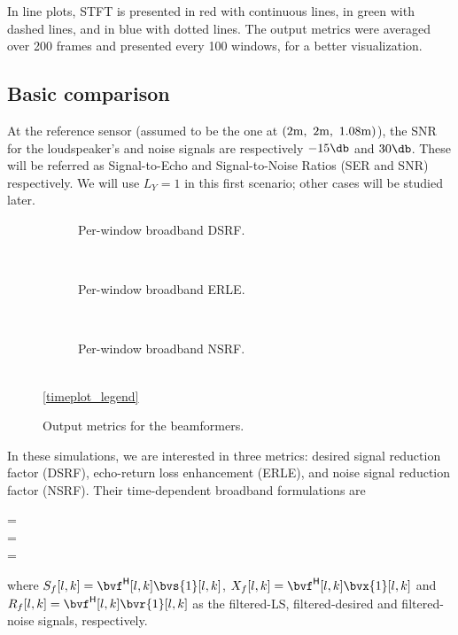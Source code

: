 In line plots, STFT is presented in red with continuous lines, \nssbt{} in green with dashed lines, and \tssbt{} in blue with dotted lines. The output metrics were averaged over 200 frames and presented every 100 windows, for a better visualization.
%

\subsection{Basic comparison}
At the reference sensor (assumed to be the one at $(2\si{\meter},~2\si{\meter},~1.08\si{\meter})$), the SNR for the loudspeaker's and noise signals are respectively $-15\dB$ and $30\dB$. These will be referred as Signal-to-Echo and Signal-to-Noise Ratios (SER and SNR) respectively. We will use $L_Y = 1$ in this first scenario; other cases will be studied later.%


\begin{figure}[!t]
	\centering
	\begin{subfigure}{\textwidth}
		\centering
		
		\caption{Per-window broadband DSRF.}
		\label{subfig:lineplot__v7__DSRF_l__iSER_n15__Ly_1__err_0}
	\end{subfigure}\\[1em]
	\begin{subfigure}{\textwidth}
		\centering
		
		\caption{Per-window broadband ERLE.}
		\label{subfig:lineplot__v7__ERLE_l__iSER_n15__Ly_1__err_0}
	\end{subfigure}\\[1em]
	\begin{subfigure}{\textwidth}
		\centering
		
		\caption{Per-window broadband NSRF.}
		\label{subfig:lineplot__v7__NSRF_l__iSER_n15__Ly_1__err_0}
	\end{subfigure}\\[1em]
	\ref*{timeplot_legend}
	\caption{Output metrics for the beamformers.}
	\label{fig:lineplot__v7__iSER_n15__Ly_1__err_0}
\end{figure}

In these simulations, we are interested in three metrics: desired signal reduction factor (DSRF), echo-return loss enhancement (ERLE), and noise signal reduction factor (NSRF). Their time-dependent broadband formulations are
\begin{subgather}
	\dsrf[l] =  \\
	\erle[l] =  \\
	\nsrf[l] = 
\end{subgather}
where $S_f[l,k] = \he{\bvf}[l,k] \bvs{1}[l,k]$, $X_f[l,k] = \he{\bvf}[l,k] \bvx{1}[l,k]$ and $R_f[l,k] = \he{\bvf}[l,k] \bvr{1}[l,k]$ as the filtered-LS, filtered-desired and filtered-noise signals, respectively.

